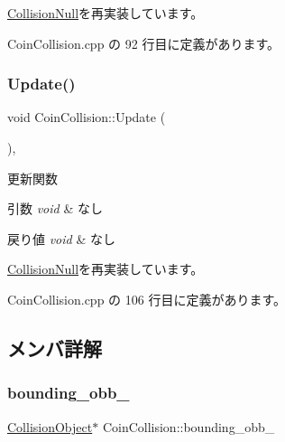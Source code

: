 \mbox{\hyperlink{class_collision_null_a7c6d0ec502efc55e2f406415451152f5}{Collision\+Null}}を再実装しています。



 Coin\+Collision.\+cpp の 92 行目に定義があります。

\mbox{\label{class_coin_collision_a981fd9b1b8c688a757a456a56d80501b}} 
\subsubsection{\texorpdfstring{Update()}{Update()}}
{\footnotesize\ttfamily void Coin\+Collision\+::\+Update (\begin{DoxyParamCaption}{ }\end{DoxyParamCaption})\hspace{0.3cm}{\ttfamily [override]}, {\ttfamily [virtual]}}



更新関数 


\begin{DoxyParams}{引数}
{\em void} & なし \\
\hline
\end{DoxyParams}

\begin{DoxyRetVals}{戻り値}
{\em void} & なし \\
\hline
\end{DoxyRetVals}


\mbox{\hyperlink{class_collision_null_a5e5e094e3fbe3ccc0515e485c739bd15}{Collision\+Null}}を再実装しています。



 Coin\+Collision.\+cpp の 106 行目に定義があります。



\subsection{メンバ詳解}
\mbox{\label{class_coin_collision_ac604781e9ab6194c06bf9ca7f426bd95}} 
\subsubsection{\texorpdfstring{bounding\+\_\+obb\+\_\+}{bounding\_obb\_}}
{\footnotesize\ttfamily \mbox{\hyperlink{class_collision_object}{Collision\+Object}}$\ast$ Coin\+Collision\+::bounding\+\_\+obb\+\_\+\hspace{0.3cm}{\ttfamily [private]}}



